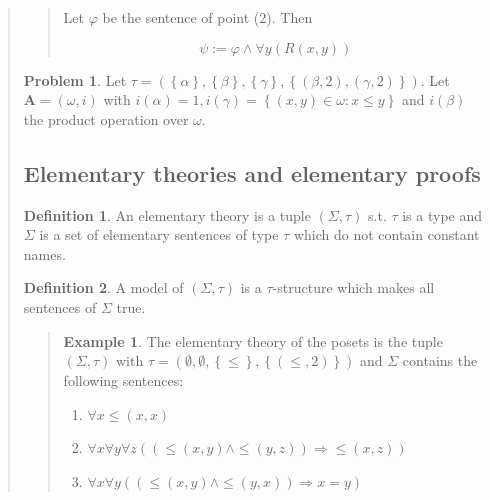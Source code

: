 \documentclass[a4paper, 12pt]{article}
\theoremstyle{definition}
\newtheorem{problem}{Problem}
\theoremstyle{definition}
\newtheorem{example}{Example}
\theoremstyle{definition}
\newtheorem{definition}{Definition}
\begin{document}
\begin{quote}
\begin{quote}
    Let $\varphi$ be the sentence of point (2). Then 

    \begin{equation*}
        \psi := \varphi \land \forall y (R(x, y))
    \end{equation*}


\end{quote}
\normalsize

\begin{problem}
    Let $\tau = \left( \left\{ \alpha \right\}, \left\{ \beta \right\}, \left\{ \gamma \right\}, \left\{ (\beta, 2), (\gamma, 2) \right\}     \right) $. Let $\textbf{A} = (\omega, i)$ with $i(\alpha) = 1, i(\gamma) = \left\{ (x, y) \in \omega : x \leq y \right\}  $ and $i(\beta)$ the product operation over $\omega$.
\end{problem}


\subsection{Elementary theories and elementary proofs}

\begin{definition}
    An elementary theory is a tuple $(\Sigma, \tau)$ s.t. $\tau$ is a type and $\Sigma$
    is a set of elementary sentences of type $\tau$ which do not 
    contain constant names.
\end{definition}

\begin{definition}
    A model of $(\Sigma, \tau)$ is a $\tau$-structure which makes all 
    sentences of $\Sigma$ true.
\end{definition}


\small
\begin{quote}

\begin{example}
    The elementary theory of the posets is the tuple $(\Sigma, \tau)$ with 
    $\tau = (\emptyset, \emptyset, \left\{ \leq \right\}, \left\{ (\leq, 2) \right\} )$ 
    and $\Sigma$ contains the following sentences: 

    \begin{enumerate}
        \item $\forall x  \leq(x, x)$
        \item $\forall x \forall y \forall z \left( (\leq(x, y) \land  \leq(y, z) ) \Rightarrow\leq(x, z) \right) $
        \item $\forall x \forall y \left( (\leq(x, y) \land  \leq(y, x)) \Rightarrow x = y \right) $
    \end{enumerate}


\end{example}
\end{quote}
\end{quote}
\end{document}
